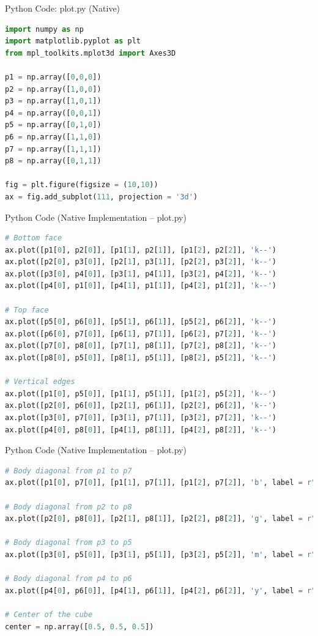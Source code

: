 \documentclass{beamer}
\begin{document}
\begin{frame}[fragile]{Python Code: plot.py (Native)}
\begin{lstlisting}[language=Python]
import numpy as np
import matplotlib.pyplot as plt
from mpl_toolkits.mplot3d import Axes3D

p1 = np.array([0,0,0])
p2 = np.array([1,0,0])
p3 = np.array([1,0,1])
p4 = np.array([0,0,1])
p5 = np.array([0,1,0])
p6 = np.array([1,1,0])
p7 = np.array([1,1,1])
p8 = np.array([0,1,1])

fig = plt.figure(figsize = (10,10))
ax = fig.add_subplot(111, projection = '3d')
\end{lstlisting}
\end{frame}


\begin{frame}[fragile]{Python Code (Native Implementation – plot.py)}
\begin{lstlisting}[language=Python]
# Bottom face
ax.plot([p1[0], p2[0]], [p1[1], p2[1]], [p1[2], p2[2]], 'k--')
ax.plot([p2[0], p3[0]], [p2[1], p3[1]], [p2[2], p3[2]], 'k--')
ax.plot([p3[0], p4[0]], [p3[1], p4[1]], [p3[2], p4[2]], 'k--')
ax.plot([p4[0], p1[0]], [p4[1], p1[1]], [p4[2], p1[2]], 'k--')

# Top face
ax.plot([p5[0], p6[0]], [p5[1], p6[1]], [p5[2], p6[2]], 'k--')
ax.plot([p6[0], p7[0]], [p6[1], p7[1]], [p6[2], p7[2]], 'k--')
ax.plot([p7[0], p8[0]], [p7[1], p8[1]], [p7[2], p8[2]], 'k--')
ax.plot([p8[0], p5[0]], [p8[1], p5[1]], [p8[2], p5[2]], 'k--')

# Vertical edges
ax.plot([p1[0], p5[0]], [p1[1], p5[1]], [p1[2], p5[2]], 'k--')
ax.plot([p2[0], p6[0]], [p2[1], p6[1]], [p2[2], p6[2]], 'k--')
ax.plot([p3[0], p7[0]], [p3[1], p7[1]], [p3[2], p7[2]], 'k--')
ax.plot([p4[0], p8[0]], [p4[1], p8[1]], [p4[2], p8[2]], 'k--')
\end{lstlisting}
\end{frame}

\begin{frame}[fragile]{Python Code (Native Implementation – plot.py)}
\begin{lstlisting}[language=Python]
# Body diagonal from p1 to p7
ax.plot([p1[0], p7[0]], [p1[1], p7[1]], [p1[2], p7[2]], 'b', label = r"d1 makes angle $\alpha$ with Line L")

# Body diagonal from p2 to p8
ax.plot([p2[0], p8[0]], [p2[1], p8[1]], [p2[2], p8[2]], 'g', label = r"d2 makes angle $\beta$ with Line L")

# Body diagonal from p3 to p5
ax.plot([p3[0], p5[0]], [p3[1], p5[1]], [p3[2], p5[2]], 'm', label = r"d3 makes angle $\gamma$ with Line L")

# Body diagonal from p4 to p6
ax.plot([p4[0], p6[0]], [p4[1], p6[1]], [p4[2], p6[2]], 'y', label = r"d4 makes angle $\delta$ with Line L")

# Center of the cube
center = np.array([0.5, 0.5, 0.5])

\end{lstlisting}
\end{frame}
\end{document}
